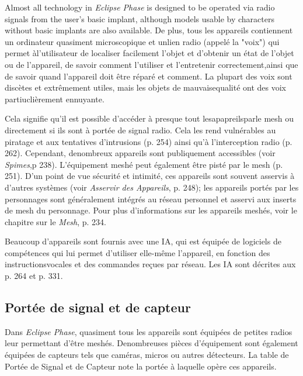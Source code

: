 Almost all technology in \emph{Eclipse Phase} is designed to be operated via radio signals from the user’s basic implant, although models usable by characters without basic implants are also available. De plus, tous les appareils contiennent un ordinateur quasiment microscopique et unlien radio (appelé la "voix") qui permet àl'utilisateur de localiser facilement l'objet et d'obtenir un état de l'objet ou de l'appareil, de savoir comment l'utiliser et l'entretenir correctement,ainsi que de savoir quand l'appareil doit être réparé et comment. La plupart des voix sont discètes et extrêmement utiles, mais les objets de mauvaisequalité ont des voix partiuclièrement ennuyante. 

Cela signifie qu'il est possible d'accéder à presque tout lesapapreilsparle mesh ou directement si ils sont à portée de signal radio. Cela les rend vulnérables au piratage et aux tentatives d'intrusions (p. 254) ainsi qu'à l'interception radio (p. 262). Cependant, denombreux appareils sont publiquement accessibles (voir \emph{Spimes},p 238). L'équipement meshé peut également être pisté par le mesh (p. 251). D'un point de vue sécurité et intimité, ces appareils sont souvent asservis à d'autres systèmes (voir \emph{Asservir des Appareils}, p. 248); les appareils portés par les personnages sont généralement intégrés au réseau personnel et asservi aux inserts de mesh du personnage. Pour plus d'informations sur les appareils meshés, voir le chapitre sur le \emph{Mesh}, p. 234. 

Beaucoup d'appareils sont fournis avec une IA, qui est équipée de logiciels de compétences qui lui permet d'utiliser elle-même l'appareil, en fonction des instructionsvocales et des commandes reçues par réseau. Les IA sont décrites aux p. 264 et p. 331. 



\subsection{Portée de signal et de capteur} \label{sec:radio-sensor-ranges} 

Dans \emph{Eclipse Phase}, quasiment tous les appareils sont équipées de petites radios leur permettant d'être meshés. Denombreuses pièces d'équipement sont également équipées de capteurs tels que caméras, micros ou autres détecteurs. La table de Portée de Signal et de Capteur note la portée à laquelle opère ces appareils. 

